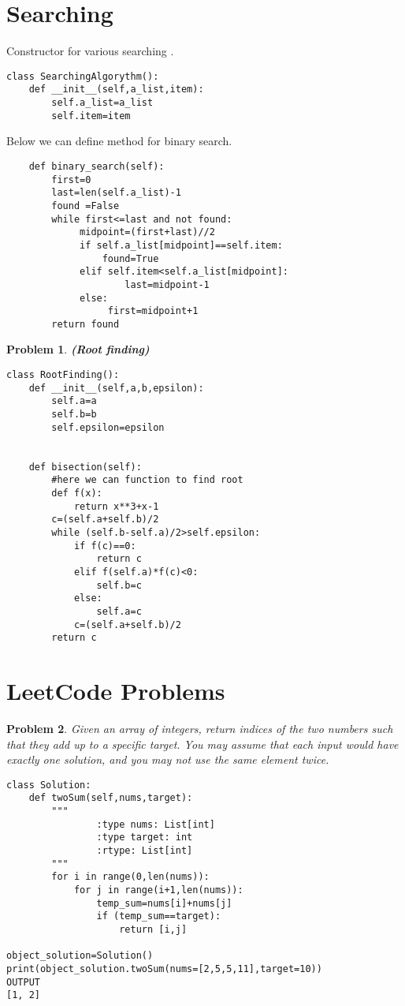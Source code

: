 \documentclass{book}
\newtheorem{problem}{Problem}[section]
\begin{document}
\section{Searching}
Constructor for various searching .
\begin{verbatim}
class SearchingAlgorythm():
    def __init__(self,a_list,item):
        self.a_list=a_list
        self.item=item
\end{verbatim}
Below we can define method for binary search.
\begin{verbatim}
    def binary_search(self):
        first=0
        last=len(self.a_list)-1
        found =False
        while first<=last and not found:
             midpoint=(first+last)//2
             if self.a_list[midpoint]==self.item:
                 found=True
             elif self.item<self.a_list[midpoint]:
                     last=midpoint-1
             else:
                  first=midpoint+1
        return found
\end{verbatim}







\begin{problem}\textbf{(Root finding)}
\begin{verbatim}
class RootFinding():
    def __init__(self,a,b,epsilon):
        self.a=a
        self.b=b
        self.epsilon=epsilon


    def bisection(self):
        #here we can function to find root
        def f(x):
            return x**3+x-1
        c=(self.a+self.b)/2
        while (self.b-self.a)/2>self.epsilon:
            if f(c)==0:
                return c
            elif f(self.a)*f(c)<0:
                self.b=c
            else:
                self.a=c
            c=(self.a+self.b)/2
        return c
\end{verbatim}
\end{problem}
\section{LeetCode Problems}
\begin{problem}
Given an array of integers, return indices of the two numbers such that they add up to a specific target.
You may assume that each input would have exactly one solution, and you may not use the same element twice.

\begin{verbatim}
class Solution:
    def twoSum(self,nums,target):
        """
                :type nums: List[int]
                :type target: int
                :rtype: List[int]
        """
        for i in range(0,len(nums)):
            for j in range(i+1,len(nums)):
                temp_sum=nums[i]+nums[j]
                if (temp_sum==target):
                    return [i,j]
                    
object_solution=Solution()
print(object_solution.twoSum(nums=[2,5,5,11],target=10)) 
OUTPUT
[1, 2]                   
\end{verbatim}
\end{problem}
\end{document}
